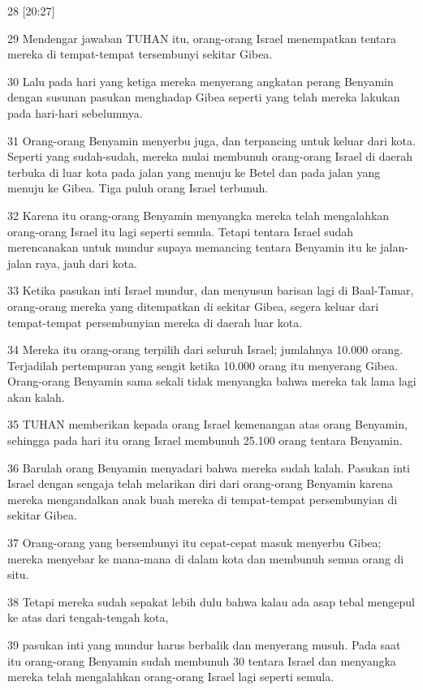 \par 28 [20:27]
\par 29 Mendengar jawaban TUHAN itu, orang-orang Israel menempatkan tentara mereka di tempat-tempat tersembunyi sekitar Gibea.
\par 30 Lalu pada hari yang ketiga mereka menyerang angkatan perang Benyamin dengan susunan pasukan menghadap Gibea seperti yang telah mereka lakukan pada hari-hari sebelumnya.
\par 31 Orang-orang Benyamin menyerbu juga, dan terpancing untuk keluar dari kota. Seperti yang sudah-sudah, mereka mulai membunuh orang-orang Israel di daerah terbuka di luar kota pada jalan yang menuju ke Betel dan pada jalan yang menuju ke Gibea. Tiga puluh orang Israel terbunuh.
\par 32 Karena itu orang-orang Benyamin menyangka mereka telah mengalahkan orang-orang Israel itu lagi seperti semula. Tetapi tentara Israel sudah merencanakan untuk mundur supaya memancing tentara Benyamin itu ke jalan-jalan raya, jauh dari kota.
\par 33 Ketika pasukan inti Israel mundur, dan menyusun barisan lagi di Baal-Tamar, orang-orang mereka yang ditempatkan di sekitar Gibea, segera keluar dari tempat-tempat persembunyian mereka di daerah luar kota.
\par 34 Mereka itu orang-orang terpilih dari seluruh Israel; jumlahnya 10.000 orang. Terjadilah pertempuran yang sengit ketika 10.000 orang itu menyerang Gibea. Orang-orang Benyamin sama sekali tidak menyangka bahwa mereka tak lama lagi akan kalah.
\par 35 TUHAN memberikan kepada orang Israel kemenangan atas orang Benyamin, sehingga pada hari itu orang Israel membunuh 25.100 orang tentara Benyamin.
\par 36 Barulah orang Benyamin menyadari bahwa mereka sudah kalah. Pasukan inti Israel dengan sengaja telah melarikan diri dari orang-orang Benyamin karena mereka mengandalkan anak buah mereka di tempat-tempat persembunyian di sekitar Gibea.
\par 37 Orang-orang yang bersembunyi itu cepat-cepat masuk menyerbu Gibea; mereka menyebar ke mana-mana di dalam kota dan membunuh semua orang di situ.
\par 38 Tetapi mereka sudah sepakat lebih dulu bahwa kalau ada asap tebal mengepul ke atas dari tengah-tengah kota,
\par 39 pasukan inti yang mundur harus berbalik dan menyerang musuh. Pada saat itu orang-orang Benyamin sudah membunuh 30 tentara Israel dan menyangka mereka telah mengalahkan orang-orang Israel lagi seperti semula.
